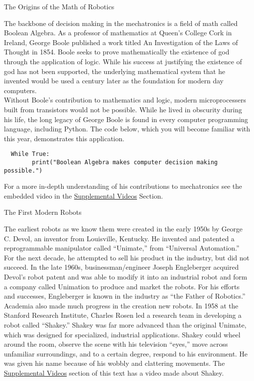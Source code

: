 \documentclass[
]{book}
\begin{document}
The Origins of the Math of Robotics

The backbone of decision making in the mechatronics is a field of math called Boolean Algebra. As a professor of mathematics at Queen's College Cork in Ireland, George Boole published a work titled An Investigation of the Laws of Thought in 1854. Boole seeks to prove mathematically the existence of god through the application of logic. While his success at justifying the existence of god has not been supported, the underlying mathematical system that he invented would be used a century later as the foundation for modern day computers.\\
Without Boole's contribution to mathematics and logic, modern microprocessers built from transistors would not be possible. While he lived in obscurity during his life, the long legacy of George Boole is found in every computer programming language, including Python. The code below, which you will become familiar with this year, demonstrates this application.

\begin{verbatim}
  While True:
        print("Boolean Algebra makes computer decision making possible.")
\end{verbatim}

For a more in-depth understanding of his contributions to mechatronics see the embedded video in the \protect\hyperlink{supplemental-videos}{Supplemental Videos} Section.

The First Modern Robots

The earliest robots as we know them were created in the early 1950s by George C. Devol, an inventor from Louisville, Kentucky. He invented and patented a reprogrammable manipulator called ``Unimate,'' from ``Universal Automation.'' For the next decade, he attempted to sell his product in the industry, but did not succeed. In the late 1960s, businessman/engineer Joseph Engleberger acquired Devol's robot patent and was able to modify it into an industrial robot and form a company called Unimation to produce and market the robots. For his efforts and successes, Engleberger is known in the industry as ``the Father of Robotics.''
Academia also made much progress in the creation new robots. In 1958 at the Stanford Research Institute, Charles Rosen led a research team in developing a robot called ``Shakey.'' Shakey was far more advanced than the original Unimate, which was designed for specialized, industrial applications. Shakey could wheel around the room, observe the scene with his television ``eyes,'' move across unfamiliar surroundings, and to a certain degree, respond to his environment. He was given his name because of his wobbly and clattering movements. The \protect\hyperlink{supplemental-videos}{Supplemental Videos} section of this text has a video made about Shakey.
\end{document}
